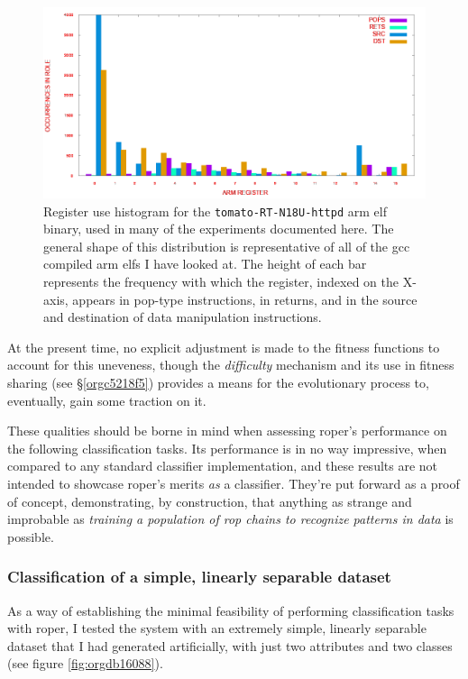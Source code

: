 \documentclass[12pt,glossary]{dalthesis}
\begin{document}
\begin{figure}[htbp]
\centering
\includegraphics[width=.9\linewidth]{../images/plots/tomato-register-histogram.png}
\caption{\label{fig:org642c05e}
Register use histogram for the \texttt{tomato-RT-N18U-httpd} \gls{arm} \gls{elf} binary, used in many of the experiments documented here. The general shape of this distribution is representative of all of the \gls{gcc} compiled \gls{arm} \glspl{elf} I have looked at. The height of each bar represents the frequency with which the register, indexed on the X-axis, appears in pop-type instructions, in returns, and in the source and destination of data manipulation instructions.}
\end{figure}

At the present time, no explicit adjustment is made to the fitness functions
to account for this uneveness, though the \emph{difficulty} mechanism and its use in
fitness sharing (see \S \ref{orgc5218f5}) provides a means for the evolutionary
process to, eventually, gain some traction on it.

These qualities should be borne in mind when assessing \gls{roper}'s performance
on the following classification tasks. Its performance is in no way impressive,
when compared to any standard classifier implementation, and these results are
not intended to showcase \gls{roper}'s merits \emph{as} a classifier. They're put
forward as a proof of concept, demonstrating, by construction, that anything as
strange and improbable as \emph{training a population of \gls{rop} chains to recognize
patterns in data} is possible.

\subsubsection{Classification of a simple, linearly separable dataset}
\label{sec:org77c1116}
\label{org410a7d6}

As a way of establishing the minimal feasibility of performing classification
tasks with \gls{roper}, I tested the system with an extremely simple, linearly
separable dataset that I had generated artificially, with just two attributes
and two classes (see figure \ref{fig:orgdb16088}).
\end{document}
